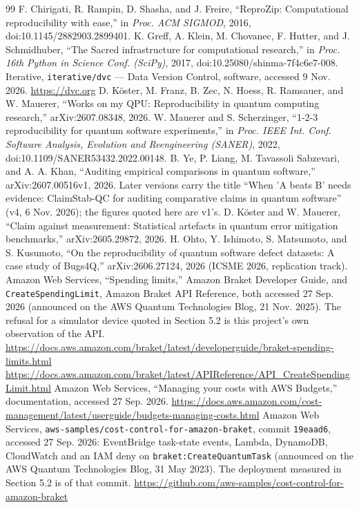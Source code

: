 \documentclass[acmsmall,screen,review]{acmart}
\begin{document}
\begin{thebibliography}{99}
 F. Chirigati, R. Rampin, D. Shasha, and J. Freire, ``ReproZip: Computational reproducibility with ease,'' in \textit{Proc. ACM SIGMOD}, 2016, doi:10.1145/2882903.2899401.
 K. Greff, A. Klein, M. Chovanec, F. Hutter, and J. Schmidhuber, ``The Sacred infrastructure for computational research,'' in \textit{Proc. 16th Python in Science Conf. (SciPy)}, 2017, doi:10.25080/shinma-7f4c6e7-008.
 Iterative, \texttt{iterative/dvc} --- Data Version Control, software, accessed 9 Nov. 2026. {\url{https://dvc.org}}
 D. K\"{o}ster, M. Franz, B. Zec, N. Hoess, R. Ramsauer, and W. Mauerer, ``Works on my QPU: Reproducibility in quantum computing research,'' arXiv:2607.08348, 2026.
 W. Mauerer and S. Scherzinger, ``1-2-3 reproducibility for quantum software experiments,'' in \textit{Proc. IEEE Int. Conf. Software Analysis, Evolution and Reengineering (SANER)}, 2022, doi:10.1109/SANER53432.2022.00148.
 B. Ye, P. Liang, M. Tavassoli Sabzevari, and A. A. Khan, ``Auditing empirical comparisons in quantum software,'' arXiv:2607.00516v1, 2026. Later versions carry the title ``When 'A beats B' needs evidence: ClaimStab-QC for auditing comparative claims in quantum software'' (v4, 6 Nov. 2026); the figures quoted here are v1's.
 D. K\"{o}ster and W. Mauerer, ``Claim against measurement: Statistical artefacts in quantum error mitigation benchmarks,'' arXiv:2605.29872, 2026.
 H. Ohto, Y. Ishimoto, S. Matsumoto, and S. Kusumoto, ``On the reproducibility of quantum software defect datasets: A case study of Bugs4Q,'' arXiv:2606.27124, 2026 (ICSME 2026, replication track).
 Amazon Web Services, ``Spending limits,'' Amazon Braket Developer Guide, and \texttt{Create\allowbreak{}Spending\allowbreak{}Limit}, Amazon Braket API Reference, both accessed 27 Sep. 2026 (announced on the AWS Quantum Technologies Blog, 21 Nov. 2025). The refusal for a simulator device quoted in Section 5.2 is this project's own observation of the API. {\url{https://docs.aws.amazon.com/braket/latest/developerguide/braket-spending-limits.html}} {\url{https://docs.aws.amazon.com/braket/latest/APIReference/API_CreateSpendingLimit.html}}
 Amazon Web Services, ``Managing your costs with AWS Budgets,'' documentation, accessed 27 Sep. 2026. {\url{https://docs.aws.amazon.com/cost-management/latest/userguide/budgets-managing-costs.html}}
 Amazon Web Services, \texttt{aws-\allowbreak{}samples/\allowbreak{}cost-\allowbreak{}control-\allowbreak{}for-\allowbreak{}amazon-\allowbreak{}braket}, commit \texttt{19eaad6}, accessed 27 Sep. 2026: EventBridge task-state events, Lambda, DynamoDB, CloudWatch and an IAM deny on \texttt{braket:\allowbreak{}Create\allowbreak{}Quantum\allowbreak{}Task} (announced on the AWS Quantum Technologies Blog, 31 May 2023). The deployment measured in Section 5.2 is of that commit. {\url{https://github.com/aws-samples/cost-control-for-amazon-braket}}

\end{thebibliography}
\end{document}

